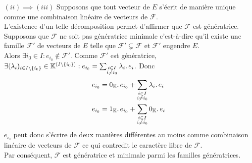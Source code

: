 \documentclass{article}
\begin{document}
\begin{question_kholle}
		$(ii) \implies (iii)$ Supposons que tout vecteur de $E$ s'écrit de manière unique comme une combinaison linéaire de vecteurs de $\mathcal{F}$. \\
		L'existence d'un telle décomposition permet d'affirmer que $\mathcal{F}$ est génératrice. \\
		Supposons que $\mathcal{F}$ ne soit pas génératrice minimale c'est-à-dire qu'il existe une famille $\mathcal{F}'$ de vecteurs de $E$ telle que $\mathcal{F}' \subsetneq \mathcal{F}$ et $\mathcal{F}'$ engendre $E$. \\
		Alors $\exists i_0 \in I : e_{i_0} \notin \mathcal{F}'$. Comme $\mathcal{F}'$ est génératrice, $\exists (\lambda_i)_{i \in I \setminus \{i_0\}} \in \mathbb K^{(I \setminus \{i_0\})} : e_{i_0} = \sum_{\substack{i \in I \\ i \neq i_0}} \lambda_i \ldotp e_i$.
		Donc \begin{equation*}
			\begin{aligned}
				e_{i_0} &= 0_{\mathbb K} \ldotp e_{i_0} + \sum_{\substack{i \in I \\ i \neq i_0}} \lambda_i \ldotp e_i \\
				e_{i_0} &= 1_{\mathbb K} \ldotp e_{i_0} + \sum_{\substack{i \in I \\ i \neq i_0}} 0_{\mathbb K} \ldotp e_i
			\end{aligned}
		\end{equation*}
		$e_{i_0}$ peut donc s'écrire de deux manières différentes au moins comme combinaison linéaire de vecteurs de $\mathcal{F}$ ce qui contredit le caractère libre de $\mathcal{F}$. \\
		Par conséquent, $\mathcal{F}$ est génératrice et minimale parmi les familles génératrices.


\end{question_kholle}
\end{document}

